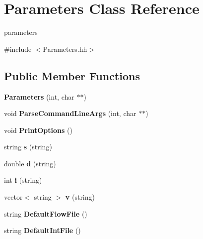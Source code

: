 \hypertarget{classParameters}{}\section{Parameters Class Reference}
\label{classParameters}


parameters  




{\ttfamily \#include $<$Parameters.\+hh$>$}

\subsection*{Public Member Functions}
\begin{DoxyCompactItemize}
\item 
\mbox{\label{classParameters_a4eb634bd1e0e8d43b62d987babd7515a}} 
{\bfseries Parameters} (int, char $\ast$$\ast$)
\item 
\mbox{\label{classParameters_ad38c9ca9ddec5626526c40c6af3187a8}} 
void {\bfseries Parse\+Command\+Line\+Args} (int, char $\ast$$\ast$)
\item 
\mbox{\label{classParameters_acd7805ae76afa9dac2ae245951b0e19d}} 
void {\bfseries Print\+Options} ()
\item 
\mbox{\label{classParameters_a7e0197950a47edef8d8e524ac7315d17}} 
string {\bfseries s} (string)
\item 
\mbox{\label{classParameters_a34eef5a83a825d72f95dfc6c1ada6cfd}} 
double {\bfseries d} (string)
\item 
\mbox{\label{classParameters_a8f547a4ac06017398f32701d244e3934}} 
int {\bfseries i} (string)
\item 
\mbox{\label{classParameters_a69037506d5bded249e005e05ab405fa5}} 
vector$<$ string $>$ {\bfseries v} (string)
\item 
\mbox{\label{classParameters_a9f4526c645801ec2389e1024255128dd}} 
string {\bfseries Default\+Flow\+File} ()
\item 
\mbox{\label{classParameters_a1a1dc0940a2973fe8ad5add5a6348da6}} 
string {\bfseries Default\+Int\+File} ()
\end{DoxyCompactItemize}
